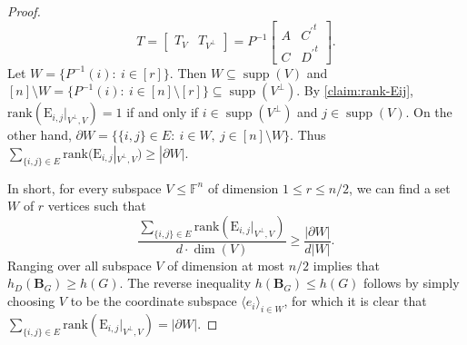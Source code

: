 \documentclass[11pt]{article}
\newcommand{\C}{{\mathbb C}}
\theoremstyle{plain}
\numberwithin{equation}{section}
\theoremstyle{definition}
\newcommand{\F}{\mathbb{F}}
\newcommand{\rk}{\mathrm{rank}}
\DeclareMathOperator{\supp}{supp}
\newcommand{\ab}[1]{\left\lvert#1\right\rvert}
\newcommand{\tuple}[1]{\mathbf{#1}}
\newcommand{\vB}{\tuple{B}}
\newcommand{\E}{\mathrm{E}}
\newcommand{\ann}{V^{\perp}}
\begin{document}
\begin{proof}
    $$
    T=
    \begin{bmatrix}
        T_V & T_{\ann}
    \end{bmatrix}
    =P^{-1}
    \begin{bmatrix}
        A&{C^{\prime}}^t\\C&{D^{\prime}}^t
    \end{bmatrix}.
    $$
    Let $W=\{P^{-1}(i):~i\in[r]\}$. Then $W\subseteq \supp(V)$ and $[n]\setminus W=\{P^{-1}(i):~i\in[n]\setminus[r]\}\subseteq \supp(\ann)$. By \cref{claim:rank-Eij}, $\rk(\E_{i,j}|_{\ann, V})=1$ if and only if $i\in\supp(\ann)$ and $j\in\supp(V)$. On the other hand, $\partial W=\{\{i,j\}\in E:~i\in W,~j\in[n]\setminus W\}$. Thus $\sum_{\{i,j\}\in E}\rk(\E_{i,j}|_{\ann, V})\geq |\partial W|$. 

    In short, for every subspace $V\leq \F^n$ of dimension $1 \leq r\leq n/2$, we can find a set $W$ of $r$ vertices such that 
    \begin{equation}\label{eq: dim edge exp greater than edge exp}
      \frac{\sum_{\{i,j\}\in E}\rk(\E_{i,j}|_{\ann, V})}{d\cdot \dim(V)}\geq \frac{|\partial W|}{d|W|}.
    \end{equation}
    Ranging over all subspace $V$ of dimension at most $n/2$ implies that $h_D(\vB_G)\geq h(G)$. The reverse inequality $h(\vB_G)\leq h(G)$ follows by simply choosing $V$ to be the coordinate subspace $\langle e_i\rangle_{i \in W}$, for which it is clear that $\sum_{\{i,j\} \in E} \rk(\E_{i,j}|_{\ann,V})=\ab{\partial W}$.
\end{proof}
\end{document}
